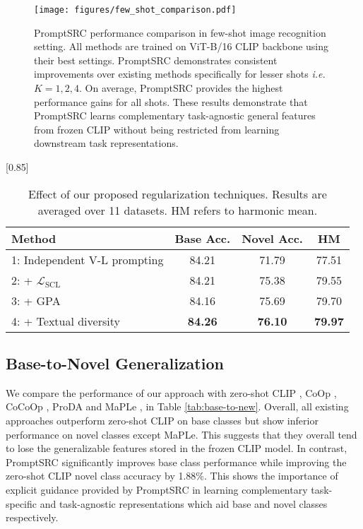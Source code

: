 \documentclass[10pt,twocolumn,letterpaper]{article}
\def\ie{\emph{i.e.}\xspace}
\begin{document}
\begin{figure*}[!ht]
\centering
{\texttt{[image: figures/few\_shot\_comparison.pdf]}}\vspace{-0.5em}
   \caption{\textnormal{PromptSRC performance comparison in few-shot image recognition setting.} All methods are trained on ViT-B/16 CLIP backbone using their best settings. PromptSRC demonstrates consistent improvements over existing methods specifically for lesser shots \ie $K=1,2,4$. On average, PromptSRC provides the highest performance gains for all shots. These results demonstrate that PromptSRC learns complementary task-agnostic general features from frozen CLIP without being restricted from learning downstream task representations.}
\label{fig:few_shot_comparision}
\end{figure*}

\begin{table}[!t]

    \small \centering
 \setlength{\tabcolsep}{8pt}
    \scalebox{0.85}[0.85]{
    \begin{tabular}{l cc | c }
    \toprule
    Method  & Base Acc. & Novel Acc. & HM\\
    \midrule
    1: Independent V-L prompting & 84.21 & 71.79 & 77.51 \\
    2: + $\mathcal{L}_\text{SCL}$ & 84.21 & 75.38 & 79.55 \\
    3: + GPA & 84.16	& 75.69	& 79.70 \\
    \rowcolor{tabhighlight}
    4: + Textual diversity & \textbf{84.26} & \textbf{76.10} & \textbf{79.97} \\
    \bottomrule
    \end{tabular}
    }\vspace{-0.5em}
    \caption{Effect of our proposed regularization techniques. Results are averaged over 11 datasets. HM refers to harmonic mean. 
    }
    \label{tab:ablations_on_components}
\end{table} \subsection{Base-to-Novel Generalization}
We compare the performance of our approach with zero-shot CLIP \cite{radford2021learning}, CoOp \cite{zhou2022learning}, CoCoOp \cite{zhou2022conditional}, ProDA \cite{lu2022prompt} and MaPLe \cite{khattak2023maple}, in Table \ref{tab:base-to-new}. Overall, all existing approaches outperform zero-shot CLIP on base classes but show inferior performance on novel classes {except MaPLe}. This suggests that they {overall} tend to lose the generalizable features stored in the frozen CLIP model. In contrast, PromptSRC significantly improves base class performance while improving the zero-shot CLIP novel class accuracy by 1.88\%. This shows the importance of explicit guidance provided by PromptSRC in learning complementary task-specific and task-agnostic representations which aid base and novel classes respectively.
\end{document}
